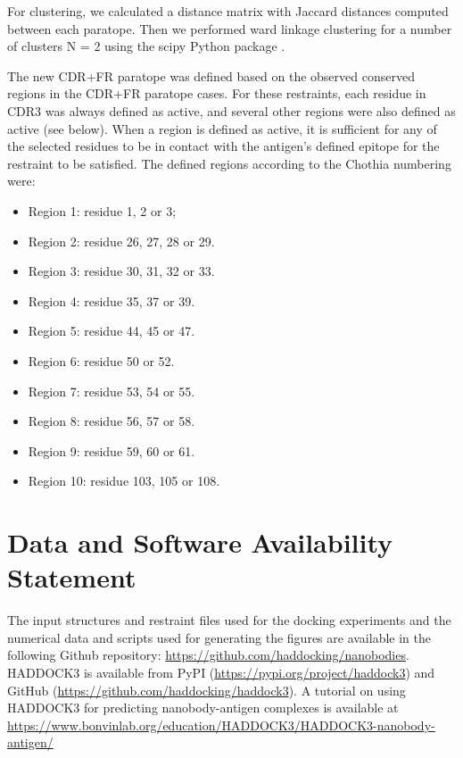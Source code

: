 \documentclass[12pt]{article}
\begin{document}
For clustering, we calculated a distance matrix with Jaccard distances computed between each paratope. Then we performed ward linkage clustering for a number of clusters N = 2 using the scipy Python package \cite{virtanen2020scipy}.

The new CDR+FR paratope was defined based on the observed conserved regions in the CDR+FR paratope cases. For these restraints, each residue in CDR3 was always defined as active, and several other regions were also defined as active (see below). When a region is defined as active, it is sufficient for any of the selected residues to be in contact with the antigen's defined epitope for the restraint to be satisfied.
The defined regions according to the Chothia numbering were:
\begin{itemize}
    \item Region 1: residue 1, 2 or 3;
    \item Region 2: residue 26, 27, 28 or 29.
    \item Region 3: residue 30, 31, 32 or 33.
    \item Region 4: residue 35, 37 or 39.
    \item Region 5: residue 44, 45 or 47.
    \item Region 6: residue 50 or 52.
    \item Region 7: residue 53, 54 or 55.
    \item Region 8: residue 56, 57 or 58.
    \item Region 9: residue 59, 60 or 61.
    \item Region 10: residue 103, 105 or 108.
\end{itemize}

\section{Data and Software Availability Statement}

The input structures and restraint files used for the docking experiments and the numerical data and scripts used for generating the figures are available in the following Github repository: \url{https://github.com/haddocking/nanobodies}. HADDOCK3 is available from PyPI (\url{https://pypi.org/project/haddock3}) and GitHub (\url{https://github.com/haddocking/haddock3}). A tutorial on using HADDOCK3 for predicting nanobody-antigen complexes is available at \url{https://www.bonvinlab.org/education/HADDOCK3/HADDOCK3-nanobody-antigen/}
\end{document}
